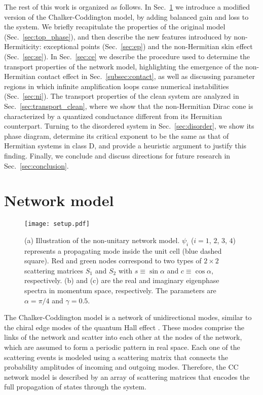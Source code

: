 \documentclass[aps,pra,reprint,superscriptaddress,showkeys,amsmath,amssymb,longbibliography]{revtex4-1}
\begin{document}
The rest of this work is organized as follows. In Sec.~\ref{sec:model} we introduce a modified version of the Chalker-Coddington model, by adding balanced gain and loss to the system.
We briefly recapitulate the properties of the original model (Sec.~\ref{sec:top_phase}), and then describe the new features introduced by non-Hermiticity: exceptional points (Sec.~\ref{sec:ep}) and the non-Hermitian skin effect (Sec.~\ref{sec:se}).
In Sec.~\ref{sec:ce} we describe the procedure used to determine the transport properties of the network model, highlighting the emergence of the non-Hermitian contact effect in Sec.~\ref{subsec:contact}, as well as discussing parameter regions in which infinite amplification loops cause numerical instabilities (Sec.~\ref{sec:ni}).
The transport properties of the clean system are analyzed in Sec.~\ref{sec:transport_clean}, where we show that the non-Hermitian Dirac cone is characterized by a quantized conductance different from its Hermitian counterpart.
Turning to the disordered system in Sec.~\ref{sec:disorder}, we show its phase diagram, determine its critical exponent to be the same as that of Hermitian systems in class D, and provide a heuristic argument to justify this finding.
Finally, we conclude and discuss directions for future research in Sec.~\ref{sec:conclusion}.

\section{Network model}
\label{sec:model}

\begin{figure}
\centering
\texttt{[image: setup.pdf]}
\caption{(a) Illustration of the non-unitary network model. 
$\psi_i$ ($i = 1$, $2$, $3$, $4$) represents a propagating mode inside the unit cell (blue dashed square). 
Red and green nodes correspond to two types of $2\times 2$ scattering matrices $S_1$ and $S_2$ with $s\equiv \sin\alpha$ and $c\equiv \cos\alpha$, respectively. 
(b) and (c) are the real and imaginary eigenphase spectra in momentum space, respectively. 
The parameters are $\alpha=\pi/4$ and $\gamma=0.5$.
\label{fig: set_up}}
\end{figure}

The Chalker-Coddington model is a network of unidirectional modes, similar to the chiral edge modes of the quantum Hall effect \cite{Chalker1988}.
These modes comprise the links of the network and scatter into each other at the nodes of the network, which are assumed to form a periodic pattern in real space.
Each one of the scattering events is modeled using a scattering matrix that connects the probability amplitudes of incoming and outgoing modes.
Therefore, the CC network model is described by an array of scattering matrices that encodes the full propagation of states through the system.
\end{document}
